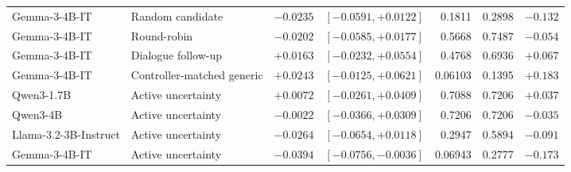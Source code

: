 \documentclass{ieeeaccess}
\begin{document}
\begin{table}[H]
\begin{tabularx}{\textwidth}{l l r X r r r}
Gemma-3-4B-IT & Random candidate & $-0.0235$ & $[-0.0591,+0.0122]$ & 0.1811 & 0.2898 & $-0.132$ \\
Gemma-3-4B-IT & Round-robin & $-0.0202$ & $[-0.0585,+0.0177]$ & 0.5668 & 0.7487 & $-0.054$ \\
Gemma-3-4B-IT & Dialogue follow-up & $+0.0163$ & $[-0.0232,+0.0554]$ & 0.4768 & 0.6936 & $+0.067$ \\
Gemma-3-4B-IT & Controller-matched generic & $+0.0243$ & $[-0.0125,+0.0621]$ & 0.06103 & 0.1395 & $+0.183$ \\
Qwen3-1.7B & Active uncertainty & $+0.0072$ & $[-0.0261,+0.0409]$ & 0.7088 & 0.7206 & $+0.037$ \\
Qwen3-4B & Active uncertainty & $-0.0022$ & $[-0.0366,+0.0309]$ & 0.7206 & 0.7206 & $-0.035$ \\
Llama-3.2-3B-Instruct & Active uncertainty & $-0.0264$ & $[-0.0654,+0.0118]$ & 0.2947 & 0.5894 & $-0.091$ \\
Gemma-3-4B-IT & Active uncertainty & $-0.0394$ & $[-0.0756,-0.0036]$ & 0.06943 & 0.2777 & $-0.173$ \\
\bottomrule
\end{tabularx}
\end{table}
\end{document}

